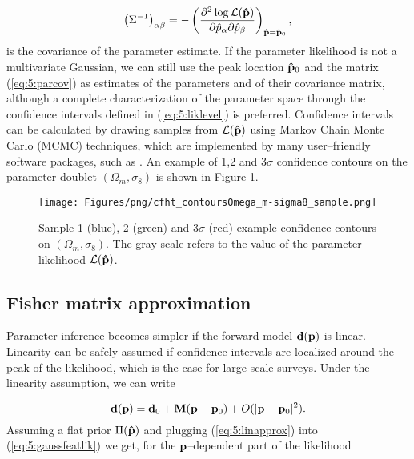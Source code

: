 \begin{equation}
\label{eq:5:parcov}
\left(\Sigma^{-1}\right)_{\alpha\beta} = -\left(\frac{\partial^2\log\mathcal{L}(\mathbf{\hat{p}})}{\partial\hat{p}_\alpha\partial\hat{p}_\beta}\right)_{\mathbf{\hat{p}}=\mathbf{\hat{p}}_0},
\end{equation}
%
is the covariance of the parameter estimate. If the parameter likelihood is not a multivariate Gaussian, we can still use the peak location $\mathbf{\hat{p}}_0$ and the matrix (\ref{eq:5:parcov}) as estimates of the parameters and of their covariance matrix, although a complete characterization of the parameter space through the confidence intervals defined in (\ref{eq:5:liklevel}) is preferred. Confidence intervals can be calculated by drawing samples from $\mathcal{L}(\mathbf{\hat{p}})$ using Markov Chain Monte Carlo (MCMC) techniques, which are implemented by many user--friendly software packages, such as  \citep{emcee}. An example of 1,2 and 3$\sigma$ confidence contours on the parameter doublet $(\Omega_m,\sigma_8)$ is shown in Figure \ref{fig:5:contsample}.

\begin{figure}
\begin{center}
\texttt{[image: Figures/png/cfht\_contoursOmega\_m-sigma8\_sample.png]}
\end{center}
\caption{Sample 1 (blue), 2 (green) and 3$\sigma$ (red) example confidence contours on $(\Omega_m,\sigma_8)$. The gray scale refers to the value of the parameter likelihood $\mathcal{L}(\mathbf{\hat{p}})$.}
\label{fig:5:contsample}
\end{figure}

\subsection{Fisher matrix approximation}
\label{sec:5:fisher}
Parameter inference becomes simpler if the forward model $\mathbf{d}(\mathbf{p})$ is linear. Linearity can be safely assumed if confidence intervals are localized around the peak of the likelihood, which is the case for large scale surveys. Under the linearity assumption, we can write 

\begin{equation}
\label{eq:5:linapprox}
\mathbf{d}(\mathbf{p}) = \mathbf{d}_0 + \mathbf{M}(\mathbf{p}-\mathbf{p}_0) + O(\vert\mathbf{p}-\mathbf{p}_0\vert^2).
\end{equation}          
%
Assuming a flat prior $\Pi(\mathbf{\hat{p}})$ and plugging (\ref{eq:5:linapprox}) into (\ref{eq:5:gaussfeatlik}) we get, for the $\mathbf{p}$--dependent part of the likelihood

